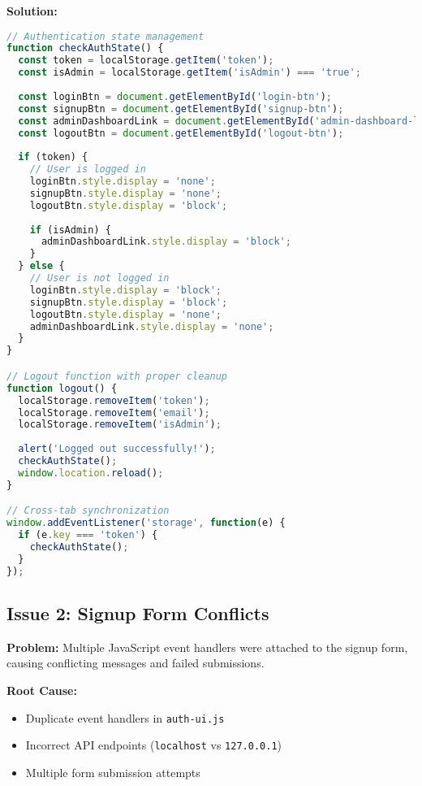 \documentclass[12pt,a4paper]{article}
\begin{document}
\textbf{Solution:}
\begin{lstlisting}[language=JavaScript, caption=Authentication State Management]
// Authentication state management
function checkAuthState() {
  const token = localStorage.getItem('token');
  const isAdmin = localStorage.getItem('isAdmin') === 'true';
  
  const loginBtn = document.getElementById('login-btn');
  const signupBtn = document.getElementById('signup-btn');
  const adminDashboardLink = document.getElementById('admin-dashboard-link');
  const logoutBtn = document.getElementById('logout-btn');
  
  if (token) {
    // User is logged in
    loginBtn.style.display = 'none';
    signupBtn.style.display = 'none';
    logoutBtn.style.display = 'block';
    
    if (isAdmin) {
      adminDashboardLink.style.display = 'block';
    }
  } else {
    // User is not logged in
    loginBtn.style.display = 'block';
    signupBtn.style.display = 'block';
    logoutBtn.style.display = 'none';
    adminDashboardLink.style.display = 'none';
  }
}

// Logout function with proper cleanup
function logout() {
  localStorage.removeItem('token');
  localStorage.removeItem('email');
  localStorage.removeItem('isAdmin');
  
  alert('Logged out successfully!');
  checkAuthState();
  window.location.reload();
}

// Cross-tab synchronization
window.addEventListener('storage', function(e) {
  if (e.key === 'token') {
    checkAuthState();
  }
});
\end{lstlisting}

\subsection{Issue 2: Signup Form Conflicts}

\textbf{Problem:} Multiple JavaScript event handlers were attached to the signup form, causing conflicting messages and failed submissions.

\textbf{Root Cause:} 
\begin{itemize}
    \item Duplicate event handlers in \texttt{auth-ui.js}
    \item Incorrect API endpoints (\texttt{localhost} vs \texttt{127.0.0.1})
    \item Multiple form submission attempts
\end{itemize}
\end{document}

